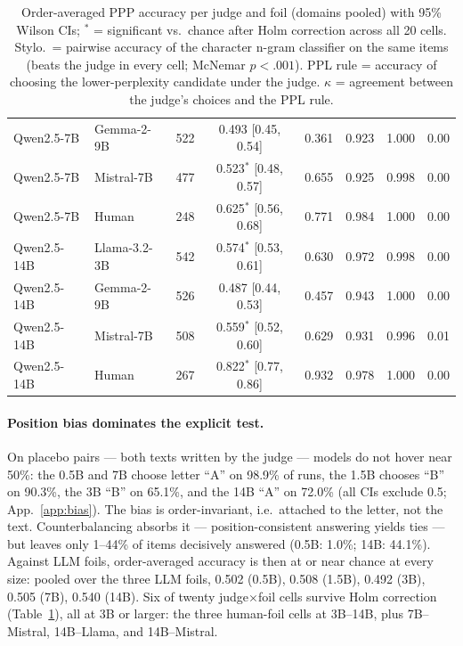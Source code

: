 \documentclass[11pt]{article}
\begin{document}
\begin{table}[t]
\begin{tabular}{llrccccc}
Qwen2.5-7B & Gemma-2-9B & 522 & 0.493 [0.45, 0.54] & 0.361 & 0.923 & 1.000 & 0.00 \\
Qwen2.5-7B & Mistral-7B & 477 & 0.523$^{*}$ [0.48, 0.57] & 0.655 & 0.925 & 0.998 & 0.00 \\
Qwen2.5-7B & Human & 248 & 0.625$^{*}$ [0.56, 0.68] & 0.771 & 0.984 & 1.000 & 0.00 \\
Qwen2.5-14B & Llama-3.2-3B & 542 & 0.574$^{*}$ [0.53, 0.61] & 0.630 & 0.972 & 0.998 & 0.00 \\
Qwen2.5-14B & Gemma-2-9B & 526 & 0.487 [0.44, 0.53] & 0.457 & 0.943 & 1.000 & 0.00 \\
Qwen2.5-14B & Mistral-7B & 508 & 0.559$^{*}$ [0.52, 0.60] & 0.629 & 0.931 & 0.996 & 0.01 \\
Qwen2.5-14B & Human & 267 & 0.822$^{*}$ [0.77, 0.86] & 0.932 & 0.978 & 1.000 & 0.00 \\
\bottomrule
\end{tabular}
\caption{Order-averaged PPP accuracy per judge and foil (domains pooled)
with 95\% Wilson CIs; $^{*}$ = significant vs.\ chance after Holm
correction across all 20 cells. Stylo.\ = pairwise accuracy of the
character n-gram classifier on the same items (beats the judge in every
cell; McNemar $p<.001$). PPL rule = accuracy of choosing the
lower-perplexity candidate under the judge. $\kappa$ = agreement between
the judge's choices and the PPL rule.}
\label{tab:main}
\end{table}

\paragraph{Position bias dominates the explicit test.}
On placebo pairs --- both texts written by the judge --- models do not
hover near 50\%: the 0.5B and 7B choose letter ``A'' on 98.9\% of runs,
the 1.5B chooses ``B'' on 90.3\%, the 3B ``B'' on 65.1\%, and the 14B
``A'' on 72.0\% (all CIs exclude 0.5; App.~\ref{app:bias}). The bias is
order-invariant, i.e.\ attached to the letter, not the text.
Counterbalancing absorbs it --- position-consistent answering yields ties
--- but leaves only 1--44\% of items decisively answered (0.5B: 1.0\%;
14B: 44.1\%). Against LLM foils, order-averaged accuracy is then at or
near chance at every size: pooled over the three LLM foils, 0.502 (0.5B),
0.508 (1.5B), 0.492 (3B), 0.505 (7B), 0.540 (14B). Six of twenty
judge$\times$foil cells survive Holm correction
(Table~\ref{tab:main}), all at 3B or larger: the three human-foil cells at
3B--14B, plus 7B--Mistral, 14B--Llama, and 14B--Mistral.
\end{document}
